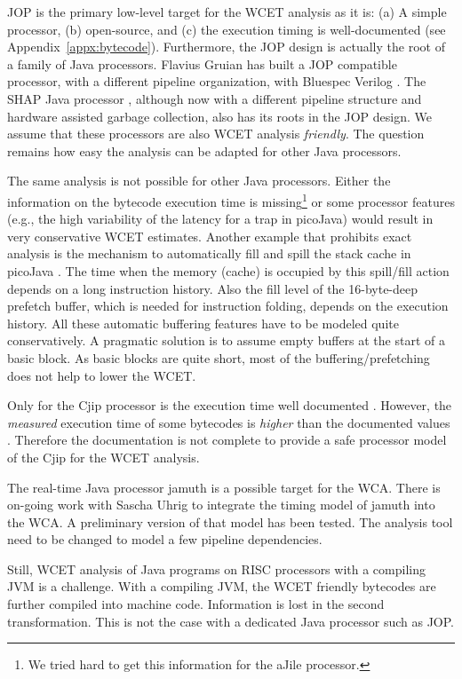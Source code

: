 JOP is the primary low-level target for the WCET analysis  as it is:
(a) A simple processor, (b) open-source, and (c) the execution timing
is well-documented (see Appendix~\ref{appx:bytecode}). Furthermore,
the JOP design is actually the root of a family of Java processors.
Flavius Gruian has built a JOP compatible processor, with a different
pipeline organization, with Bluespec Verilog \cite{flavius:bluejep}.
The SHAP Java processor \cite{shap}, although now with a different
pipeline structure and hardware assisted garbage collection, also has
its roots in the JOP design. We assume that these processors are also
WCET analysis \emph{friendly}. The question remains how easy the
analysis can be adapted for other Java processors.


The same analysis is not possible for other Java processors. Either
the information on the bytecode execution time is missing\footnote{We
tried hard to get this information for the aJile processor.} or some
processor features (e.g., the high variability of the latency for a
trap in picoJava) would result in very conservative WCET estimates.
Another example that prohibits exact analysis is the mechanism to
automatically fill and spill the stack cache in picoJava
\cite{pjMicroArch,pjProgRef}. The time when the memory (cache) is
occupied by this spill/fill action depends on a long instruction
history. Also the fill level of the 16-byte-deep prefetch buffer,
which is needed for instruction folding, depends on the execution
history. All these automatic buffering features have to be modeled
quite conservatively. A pragmatic solution is to assume empty buffers
at the start of a basic block. As basic blocks are quite short, most
of the buffering/prefetching does not help to lower the WCET.

Only for the Cjip processor is the execution time well documented
\cite{CjipRef}. However, the \emph{measured} execution time of some
bytecodes is \emph{higher} than the documented values
\cite{jop:thesis}. Therefore the documentation is not complete to
provide a safe processor model of the Cjip for the WCET analysis.

The real-time Java processor jamuth \cite{jamuth:jtres07} is a
possible target for the WCA. There is on-going work with Sascha Uhrig
to integrate the timing model of jamuth into the WCA. A preliminary
version of that model has been tested. The analysis tool need to be
changed to model a few pipeline dependencies.

Still, WCET analysis of Java programs on RISC processors with a
compiling JVM is a challenge. With a compiling JVM, the WCET friendly
bytecodes are further compiled into machine code. Information is lost
in the second transformation. This is not the case with a dedicated
Java processor such as JOP.

